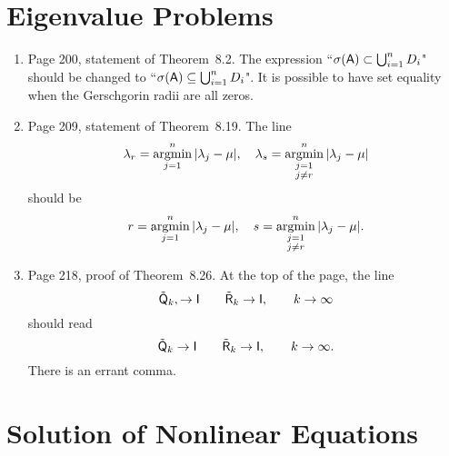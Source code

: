 \documentclass{book}
\begin{document}
	\chapter{Eigenvalue Problems}
	
	\begin{enumerate}
	\item
Page 200, statement of Theorem~8.2. The expression ``$\sigma(\mathsf{A}) \subset \bigcup_{i=1}^n D_i$" should be changed to ``$\sigma(\mathsf{A}) \subseteq \bigcup_{i=1}^n D_i$". It is possible to have set equality when the Gerschgorin radii are all zeros.

	\item
Page 209, statement of Theorem~8.19. The line
	\[
\lambda_r = \operatorname*{argmin}_{j = 1}^n  |\lambda_j - \mu | , \quad \lambda_s = \operatorname*{argmin}_{\substack{j = 1 \\ j\ne r}}^n |\lambda_j - \mu |
	\]
should be
	\[
r = \operatorname*{argmin}_{j = 1}^n  |\lambda_j - \mu | , \quad s = \operatorname*{argmin}_{\substack{j = 1 \\ j\ne r}}^n |\lambda_j - \mu |.
	\]
	
	\item
Page 218, proof of Theorem~8.26. At the top of the page, the line
	\[
\tilde{\mathsf{Q}}_{k}, \to \mathsf{I} \qquad \tilde{\mathsf{R}}_{k}\to \mathsf{I} , \qquad k\to\infty
	\]
should read
	\[
\tilde{\mathsf{Q}}_{k} \to \mathsf{I} \qquad \tilde{\mathsf{R}}_{k}\to \mathsf{I} , \qquad k\to\infty.	
	\]
There is an errant comma.
	
	\end{enumerate}

	
	\setcounter{chapter}{14}
	
	\chapter{Solution of Nonlinear Equations}
	
\end{document}
